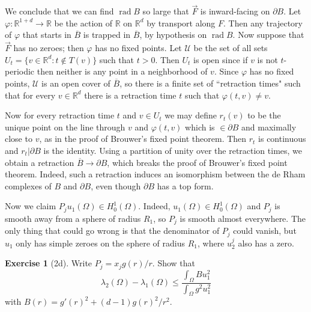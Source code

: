 \documentclass[10pt]{article}
\newcommand{\RR}{\mathbb{R}}
\DeclareMathOperator{\rad}{rad}
\theoremstyle{definition}
\newtheorem{exer}{Exercise}
\begin{document}
We conclude that we can find $\rad B$ so large that $\vec F$ is inward-facing on $\partial B$.
Let $\varphi: \RR^{1 + d} \to \RR$ be the action of $\RR$ on $\RR^d$ by transport along $F$.
Then any trajectory of $\varphi$ that starts in $\overline B$ is trapped in $\overline B$, by hypothesis on $\rad B$.
Now suppose that $\vec F$ has no zeroes; then $\varphi$ has no fixed points.
Let $\mathcal U$ be the set of all sets $U_t = \{v \in \RR^d: t \notin T(v)\}$ such that $t > 0$.
Then $U_t$ is open since if $v$ is not $t$-periodic then neither is any point in a neighborhood of $v$.
Since $\varphi$ has no fixed points, $\mathcal U$ is an open cover of $\overline B$, so there is a finite set of ``retraction times" such that for every $v \in \RR^d$ there is a retraction time $t$ such that $\varphi(t, v) \neq v$.

Now for every retraction time $t$ and $v \in U_t$ we may define $r_t(v)$ to be the unique point on the line through $v$ and $\varphi(t, v)$ which is $\in \partial B$ and maximally close to $v$, as in the proof of Brouwer's fixed point theorem.
Then $r_t$ is continuous and $r_t|\partial B$ is the identity.
Using a partition of unity over the retraction times, we obtain a retraction $\overline B \to \partial B$, which breaks the proof of Brouwer's fixed point theorem.
Indeed, such a retraction induces an isomorphism between the de Rham complexes of $B$ and $\partial B$, even though $\partial B$ has a top form.

Now we claim $P_ju_1(\Omega) \in H_0^1(\Omega)$.
Indeed, $u_1(\Omega) \in H_0^1(\Omega)$ and $P_j$ is smooth away from a sphere of radius $R_1$, so $P_j$ is smooth almost everywhere.
The only thing that could go wrong is that the denominator of $P_j$ could vanish, but $u_1$ only has simple zeroes on the sphere of radius $R_1$, where $u_2^j$ also has a zero.

\begin{exer}[2d]
Write $P_j = x_j g(r)/r$. Show that
\begin{equation}
\label{Condition 2}
\lambda_2(\Omega) - \lambda_1(\Omega) \leq \frac{\int_\Omega Bu_1^2}{\int_\Omega g^2 u_1^2}
\end{equation}
with $B(r) = g'(r)^2 + (d - 1)g(r)^2/r^2$.
\end{exer}
\end{document}
